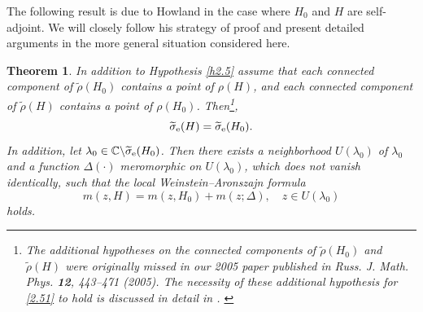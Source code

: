 \documentclass[reqno,10pt, centertags]{amsart}
\newcommand{\bbC}{{\mathbb{C}}}
\newcommand{\lb}{\label}
\newcommand{\wti}{\widetilde}
\numberwithin{equation}{section}
\newtheorem{theorem}{Theorem}[section]
\theoremstyle{definition}
\begin{document}
The following result is due to Howland in the case where $H_0$ and
$H$ are self-adjoint. We will closely follow his strategy of proof
and present detailed arguments in the more general situation considered
here.

\begin{theorem} \lb{t2.11}
In addition to Hypothesis \ref{h2.5} assume that each connected component of $\widetilde \rho(H_0)$ 
contains a point of $\rho(H)$, and each connected component of $\widetilde \rho(H)$ 
contains a point of $\rho(H_0)$. Then\footnote{The additional hypotheses on the connected components of 
$\widetilde \rho(H_0)$ and $\widetilde \rho(H)$ were originally missed in our 2005 paper published in Russ. J. Math. Phys. {\bf 12}, 443--471 (2005). The necessity of these additional hypothesis for \eqref{2.51} to hold is discussed in detail in \cite[Sect.~6]{BEG20}. \label{F}},
\begin{equation}
\wti\sigma_{\rm e}(H)=\wti\sigma_{\rm e}(H_0). \lb{2.51}
\end{equation}
In addition, let $\lambda_0\in
\bbC\backslash\wti\sigma_{\rm e}(H_0)$. Then
there exists a neighborhood $U(\lambda_0)$ of $\lambda_0$ and a
function $\Delta(\cdot)$ meromorphic on $U(\lambda_0)$, which does
not vanish identically, such that the local Weinstein--Aronszajn
formula
\begin{equation}
m(z,H)=m(z,H_0)+m(z;\Delta), \quad z\in U(\lambda_0) \lb{2.52}
\end{equation}
holds.
\end{theorem}
\end{document}
